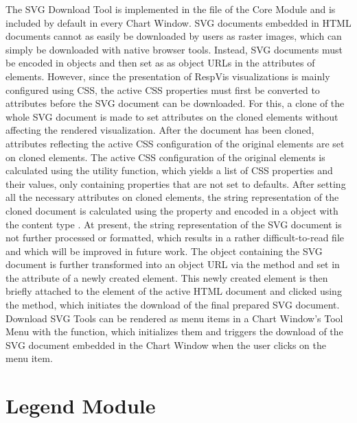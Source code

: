 The SVG Download Tool is implemented in the  file of the Core Module and is included by default in every Chart Window.
SVG documents embedded in HTML documents cannot as easily be downloaded by users as raster images, which can simply be downloaded with native browser tools. 
Instead, SVG documents must be encoded in  objects and then set as as object URLs in the  attributes of  elements.
However, since the presentation of RespVis visualizations is mainly configured using CSS, the active CSS properties must first be converted to attributes before the SVG document can be downloaded.
For this, a clone of the whole SVG document is made to set attributes on the cloned elements without affecting the rendered visualization.
After the document has been cloned, attributes reflecting the active CSS configuration of the original elements are set on cloned elements.
The active CSS configuration of the original elements is calculated using the  utility function, which yields a list of CSS properties and their values, only containing properties that are not set to defaults.  
After setting all the necessary attributes on cloned elements, the string representation of the cloned document is calculated using the  property and encoded in a  object with the content type .
At present, the string representation of the SVG document is not further processed or formatted, which results in a rather difficult-to-read file and which will be improved in future work. 
The  object containing the SVG document is further transformed into an object URL via the  method and set in the  attribute of a newly created  element.
This newly created  element is then briefly attached to the  element of the active HTML document and clicked using the  method, which initiates the download of the final prepared SVG document.
Download SVG Tools can be rendered as menu items in a Chart Window's Tool Menu with the  function, which initializes them and triggers the download of the SVG document embedded in the Chart Window when the user clicks on the menu item.

\section{Legend Module}

